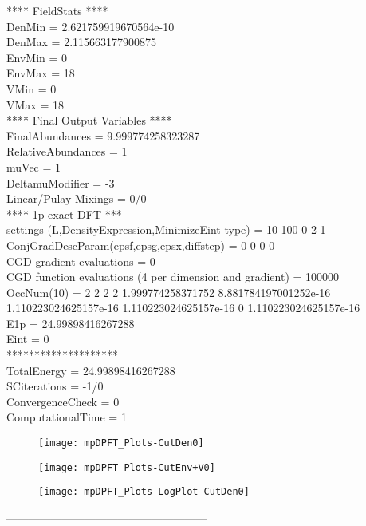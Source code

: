 \documentclass[a4paper,10pt]{article}
\begin{document}
**** FieldStats ****\\DenMin = 2.621759919670564e-10 \\DenMax = 2.115663177900875 \\EnvMin = 0 \\EnvMax = 18 \\VMin = 0 \\VMax = 18 \\**** Final Output Variables ****\\FinalAbundances              = 9.999774258323287 \\RelativeAbundances           = 1 \\muVec                        = 1 \\DeltamuModifier              = -3\\Linear/Pulay-Mixings         = 0/0\\**** 1p-exact DFT ***\\settings (L,DensityExpression,MinimizeEint-type) = 10 100 0 2 1 \\ConjGradDescParam(epsf,epsg,epsx,diffstep) = 0 0 0 0 \\CGD gradient evaluations = 0\\CGD function evaluations (4 per dimension and gradient) = 100000\\OccNum(10) = 2 2 2 2 1.999774258371752 8.881784197001252e-16 1.110223024625157e-16 1.110223024625157e-16 0 1.110223024625157e-16\\E1p = 24.99898416267288\\Eint = 0\\********************\\TotalEnergy                  = 24.99898416267288\\SCiterations                 = -1/0\\ConvergenceCheck             = 0\\ComputationalTime            = 1\\\newpage 

\begin{figure}[htb!]
\texttt{[image: mpDPFT\_Plots-CutDen0]}
\end{figure}
\begin{figure}[htb!]
\texttt{[image: mpDPFT\_Plots-CutEnv+V0]}
\end{figure}
\begin{figure}[htb!]
\texttt{[image: mpDPFT\_Plots-LogPlot-CutDen0]}
\end{figure}
 \FloatBarrier ------------------------------------------------------\newpage 
\end{document}
